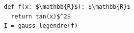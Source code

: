 \documentclass[border=10pt]{standalone}
\begin{document}
\begin{lstlisting}
def f(x: $\mathbb{R}$): $\mathbb{R}$ 
  return tan(x)$^2$
I = gauss_legendre(f)
\end{lstlisting}
\end{document}
